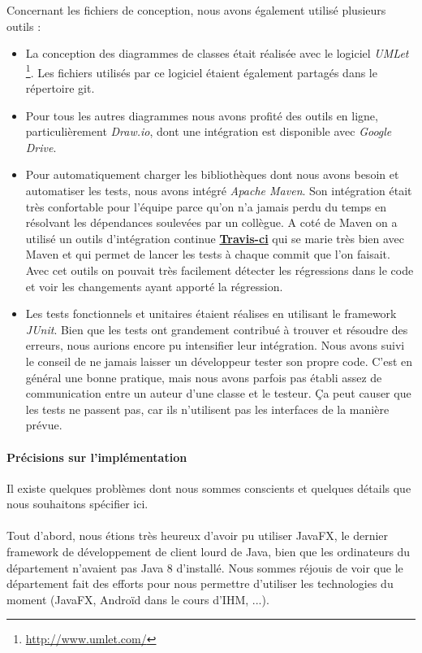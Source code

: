 \documentclass[10pt,a4paper]{book}
\begin{document}
Concernant les fichiers de conception, nous avons également utilisé plusieurs outils :
\begin{itemize}
	\item{La conception des diagrammes de classes était réalisée avec le logiciel \textit{UMLet} \footnote{\url{http://www.umlet.com/}}. Les fichiers utilisés par ce logiciel étaient également partagés dans le répertoire git.}
	\item{Pour tous les autres diagrammes nous avons profité des outils en ligne, particulièrement \textit{Draw.io}, dont une intégration est disponible avec \textit{Google Drive}.}
	\item{Pour automatiquement charger les bibliothèques dont nous avons besoin et automatiser les tests, nous avons intégré \textit{Apache Maven}. Son intégration était très confortable pour l'équipe parce qu'on n'a jamais perdu du temps en résolvant les dépendances soulevées par un collègue. A coté de Maven on a utilisé un outils d'intégration continue \href{https://travis-ci.org/}{\textbf{Travis-ci}}} qui se marie très bien avec Maven et qui permet de lancer les tests à chaque commit que l'on faisait. Avec cet outils on pouvait très facilement détecter les régressions dans le code et voir les changements ayant apporté la régression.
	\item{Les tests fonctionnels et unitaires étaient réalises en utilisant le framework \textit{JUnit}. Bien que les tests ont grandement contribué à trouver et résoudre des erreurs, nous aurions encore pu intensifier leur intégration. Nous avons suivi le conseil de ne jamais laisser un développeur tester son propre code. C'est en général une bonne pratique, mais nous avons parfois pas établi assez de communication entre un auteur d'une classe et le testeur. Ça peut causer que les tests ne passent pas, car ils n'utilisent pas les interfaces de la manière prévue.}
\end{itemize}

\paragraph{Précisions sur l'implémentation}
Il existe quelques problèmes dont nous sommes conscients et quelques détails que nous souhaitons spécifier ici.
\paragraph{}
Tout d'abord, nous étions très heureux d'avoir pu utiliser JavaFX, le dernier framework de développement de client lourd de Java, bien que les ordinateurs du département n'avaient pas Java 8 d'installé. Nous sommes réjouis de voir que le département fait des efforts pour nous permettre d'utiliser les technologies du moment (JavaFX, Androïd dans le cours d'IHM, ...).
\end{document}

